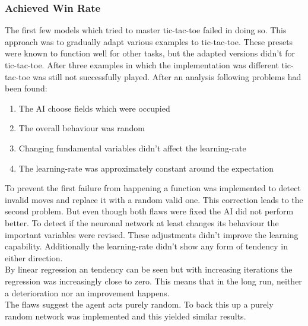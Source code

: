\documentclass[12pt]{article}
\begin{document}
\subsubsection{Achieved Win Rate}
The first few models which tried to master tic-tac-toe failed in doing so. This approach was to gradually adapt various examples to tic-tac-toe. These presets were known to function well for other tasks, but the adapted versions didn't for tic-tac-toe.
After three examples in which the implementation was different tic-tac-toe was still not successfully played. After an analysis following problems had been found:
\begin{enumerate}
    \item The AI choose fields which were occupied
    \item The overall behaviour was random
    \item Changing fundamental variables didn't affect the learning-rate
    \item The learning-rate was approximately constant around the expectation
\end{enumerate}
To prevent the first failure from happening a function was implemented to detect invalid moves and replace it with a random valid one. This correction leads to the second problem. But even though both flaws were fixed the \gls{AI} did not perform better. To detect if the \gls{neuronal network} at least changes its behaviour the important variables were revised. These adjustments didn't improve the learning capability. Additionally the learning-rate didn't show any form of tendency in either direction. \\
By linear \gls{regression} an tendency can be seen but with increasing \glspl{iteration} the \gls{regression} was increasingly close to zero. This means that in the long run, neither a deterioration nor an improvement happens. \\
The flaws suggest the agent acts purely random. To back this up a purely random network was implemented and this yielded similar results.
\end{document}
